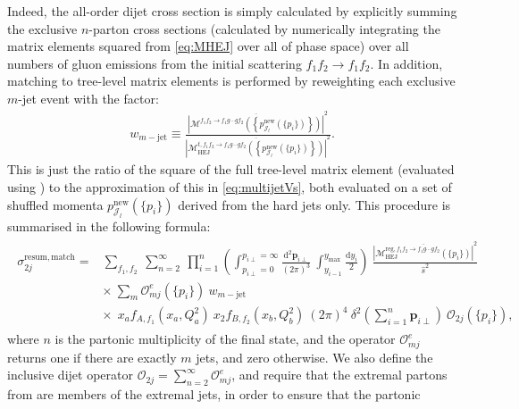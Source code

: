 Indeed, the all-order dijet cross section is  
simply calculated by explicitly summing the exclusive 
$n$-parton cross sections (calculated by numerically integrating the 
matrix elements squared from \cref{eq:MHEJ} over all of phase space)
over all numbers of gluon emissions from 
the initial scattering $f_1 f_2 \to f_1 f_2$.
In addition, matching to tree-level matrix
elements is performed by reweighting each exclusive $m$-jet event
with the factor:
\begin{align}
  w_{m-\mathrm{jet}}\equiv\frac{\overline{\left|\mathcal{M}^{f_1f_2\to f_1g\cdots
          gf_2}\left(\left\{p^\mathrm{new}_{\mathcal{J}_l}(\{p_i\})\right\}\right)\right|}^2}{\overline{\left|\mathcal{M}_{\mathrm{HEJ}}^{t,f_1f_2\to
          f_1g\cdots
          gf_2}\left(\left\{p^\mathrm{new}_{\mathcal{J}_l}(\{p_i\})\right\}\right)\right|}^2}.
\end{align}
This is just the ratio of the square of
the full tree-level matrix element (evaluated using \madgraph \cite{Alwall:2014hca})
to the approximation of this in \cref{eq:multijetVs}, both evaluated on
a set of shuffled momenta $p^\mathrm{new}_{\mathcal{J}_l}(\{p_i\})$ derived from the hard jets only. 
This procedure is summarised in the following formula:
\begin{align}
  \begin{split}
    \label{eq:resumdijetFKLmatched}
    \sigma_{2j}^\mathrm{resum, match}=&\sum_{f_1, f_2}\ \sum_{n=2}^\infty\
    \prod_{i=1}^n\left(\int_{p_{i\perp}=0}^{p_{i\perp}=\infty}
      \frac{\mathrm{d}^2\mathbf{p}_{i\perp}}{(2\pi)^3}\ 
      \int_{y_{i-1}}^{y_\mathrm{max}} \frac{\mathrm{d} y_i}{2}
    \right)\
    \frac{\overline{|\mathcal{M}_{\mathrm{HEJ}}^{\mathrm{reg},f_1 f_2\to f_1 g\cdots gf_2}(\{ p_i\})|}^2}{\hat s^2} \\
    &\times\ \sum_m \mathcal{O}_{mj}^e(\{p_i\})\ w_{m-\mathrm{jet}}\\
    &\times\ \ x_a f_{A,f_1}(x_a, Q^2_a)\ x_2 f_{B,f_2}(x_b, Q^2_b)\ (2\pi)^4\ \delta^2\!\!\left(\sum_{i=1}^n
      \mathbf{p}_{i\perp}\right )\ \mathcal{O}_{2j}(\{p_i\}),
  \end{split}
\end{align}
where $n$ is the partonic multiplicity of the final state, 
and the operator $\mathcal{O}^e_{mj}$ returns one if there are exactly $m$ jets, and zero otherwise.
We also define the inclusive dijet operator $\mathcal{O}_{2j} = \sum^\infty_{n=2} \mathcal{O}^e_{mj}$,
and require that the extremal partons from \HEJ are
members of the extremal jets, in order to ensure that the partonic
